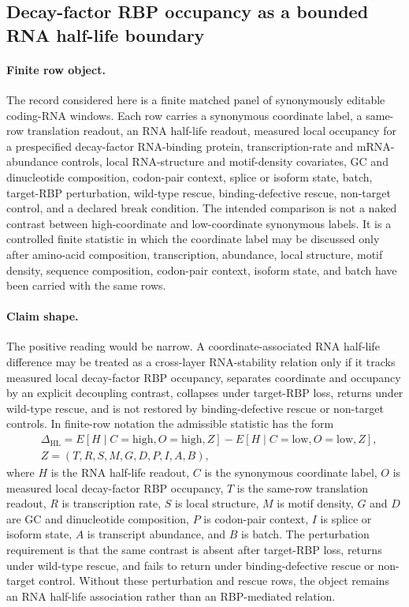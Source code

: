 \subsection{Decay-factor RBP occupancy as a bounded RNA half-life boundary}\label{subsec:decay-factor-rbp-rna-half-life-with-translation-boundary-cross-layer}

\paragraph{Finite row object.}
The record considered here is a finite matched panel of synonymously editable coding-RNA windows.  Each row carries a synonymous coordinate label, a same-row translation readout, an RNA half-life readout, measured local occupancy for a prespecified decay-factor RNA-binding protein, transcription-rate and mRNA-abundance controls, local RNA-structure and motif-density covariates, GC and dinucleotide composition, codon-pair context, splice or isoform state, batch, target-RBP perturbation, wild-type rescue, binding-defective rescue, non-target control, and a declared break condition.  The intended comparison is not a naked contrast between high-coordinate and low-coordinate synonymous labels.  It is a controlled finite statistic in which the coordinate label may be discussed only after amino-acid composition, transcription, abundance, local structure, motif density, sequence composition, codon-pair context, isoform state, and batch have been carried with the same rows.

\paragraph{Claim shape.}
The positive reading would be narrow.  A coordinate-associated RNA half-life difference may be treated as a cross-layer RNA-stability relation only if it tracks measured local decay-factor RBP occupancy, separates coordinate and occupancy by an explicit decoupling contrast, collapses under target-RBP loss, returns under wild-type rescue, and is not restored by binding-defective rescue or non-target controls.  In finite-row notation the admissible statistic has the form
$$
\begin{aligned}
&\Delta_{\mathrm{HL}}
  = E[H \mid C=\mathrm{high}, O=\mathrm{high}, Z]
  - E[H \mid C=\mathrm{low}, O=\mathrm{low}, Z],\\
&Z=(T,R,S,M,G,D,P,I,A,B),
\end{aligned}
$$
where $H$ is the RNA half-life readout, $C$ is the synonymous coordinate label, $O$ is measured local decay-factor RBP occupancy, $T$ is the same-row translation readout, $R$ is transcription rate, $S$ is local structure, $M$ is motif density, $G$ and $D$ are GC and dinucleotide composition, $P$ is codon-pair context, $I$ is splice or isoform state, $A$ is transcript abundance, and $B$ is batch.  The perturbation requirement is that the same contrast is absent after target-RBP loss, returns under wild-type rescue, and fails to return under binding-defective rescue or non-target control.  Without these perturbation and rescue rows, the object remains an RNA half-life association rather than an RBP-mediated relation.

